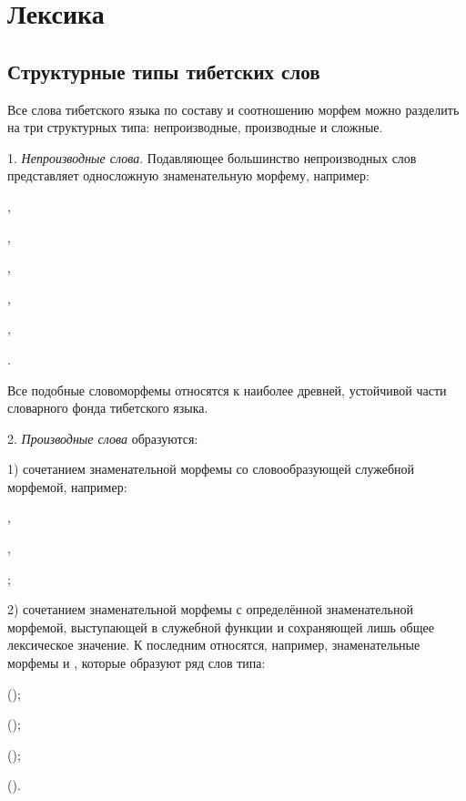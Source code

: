 \chapter{Лексика}

\section{Структурные типы тибетских слов}

Все слова тибетского языка по составу и соотношению морфем можно разделить на три структурных типа: непроизводные, производные и сложные.

1. \emph{Непроизводные слова}. Подавляющее большинство непроизводных слов представляет односложную знаменательную морфему, например:
\begin{prfsample}
	\item {},
	\item {},
	\item {},
	\item {},
	\item {},
	\item {}.	
\end{prfsample}
Все подобные словоморфемы относятся к наиболее древней, устойчивой части словарного фонда тибетского языка.

2. \emph{Производные слова} образуются:

1) сочетанием знаменательной морфемы со словообразующей служебной морфемой, например:
\begin{prfsample}
	\item {},
	\item {},
	\item {};
\end{prfsample}

2) сочетанием знаменательной морфемы с определённой знаменательной морфемой, выступающей в служебной функции и сохраняющей лишь общее лексическое значение. К последним относятся, например, знаменательные морфемы  и , которые образуют ряд слов типа:
\begin{prfsample}
	\item {} ();
	\item {} ();
	\item {} ();
	\item {} ().
\end{prfsample}

